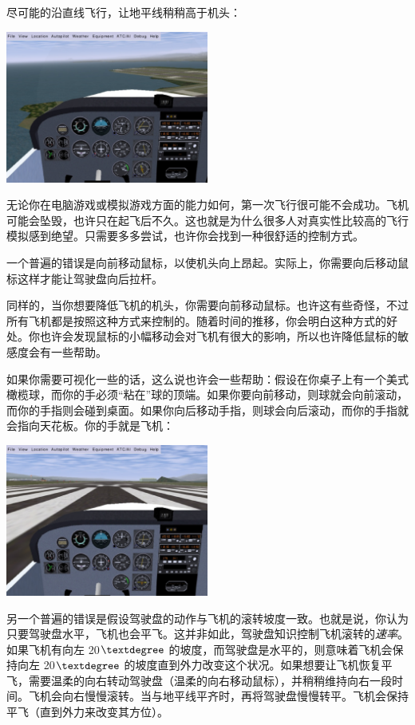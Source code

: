 尽可能的沿直线飞行，让地平线稍稍高于机头：

\begin{center}
\includegraphics[width=0.5\textwidth]{img/tut_15}
\end{center}

无论你在电脑游戏或模拟游戏方面的能力如何，第一次飞行很可能不会成功。飞机可能会坠毁，也许只在起飞后不久。这也就是为什么很多人对真实性比较高的飞行模拟感到绝望。只需要多多尝试，也许你会找到一种很舒适的控制方式。

一个普遍的错误是向前移动鼠标，以使机头向上昂起。实际上，你需要向后移动鼠标这样才能让驾驶盘向后拉杆。

同样的，当你想要降低飞机的机头，你需要向前移动鼠标。也许这有些奇怪，不过所有飞机都是按照这种方式来控制的。随着时间的推移，你会明白这种方式的好处。你也许会发现鼠标的小幅移动会对飞机有很大的影响，所以也许降低鼠标的敏感度会有一些帮助。

如果你需要可视化一些的话，这么说也许会一些帮助：假设在你桌子上有一个美式橄榄球，而你的手必须“粘在”球的顶端。如果你要向前移动，则球就会向前滚动，而你的手指则会碰到桌面。如果你向后移动手指，则球会向后滚动，而你的手指就会指向天花板。你的手就是飞机：

\begin{center}
\includegraphics[width=0.5\textwidth]{img/tut_6}
\end{center}

另一个普遍的错误是假设驾驶盘的动作与飞机的滚转坡度一致。也就是说，你认为只要驾驶盘水平，飞机也会平飞。这并非如此，驾驶盘知识控制飞机滚转的\emph{速率}。如果飞机有向左 20$\textdegree$ 的坡度，而驾驶盘是水平的，则意味着飞机会保持向左 20$\textdegree$ 的坡度直到外力改变这个状况。如果想要让飞机恢复平飞，需要温柔的向右转动驾驶盘（温柔的向右移动鼠标），并稍稍维持向右一段时间。飞机会向右慢慢滚转。当与地平线平齐时，再将驾驶盘慢慢转平。飞机会保持平飞（直到外力来改变其方位）。

